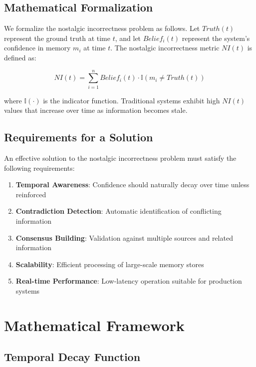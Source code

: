 \documentclass[12pt,a4paper]{article}
\begin{document}
\subsection{Mathematical Formalization}

We formalize the nostalgic incorrectness problem as follows. Let $Truth(t)$ represent the ground truth at time $t$, and let $Belief_i(t)$ represent the system's confidence in memory $m_i$ at time $t$. The nostalgic incorrectness metric $NI(t)$ is defined as:

\begin{equation}
NI(t) = \sum_{i=1}^{n} Belief_i(t) \cdot \mathbb{I}(m_i \neq Truth(t))
\end{equation}

where $\mathbb{I}(\cdot)$ is the indicator function. Traditional systems exhibit high $NI(t)$ values that increase over time as information becomes stale.

\subsection{Requirements for a Solution}

An effective solution to the nostalgic incorrectness problem must satisfy the following requirements:

\begin{enumerate}
\item \textbf{Temporal Awareness}: Confidence should naturally decay over time unless reinforced
\item \textbf{Contradiction Detection}: Automatic identification of conflicting information
\item \textbf{Consensus Building}: Validation against multiple sources and related information
\item \textbf{Scalability}: Efficient processing of large-scale memory stores
\item \textbf{Real-time Performance}: Low-latency operation suitable for production systems
\end{enumerate}

\section{Mathematical Framework}

\subsection{Temporal Decay Function}
\end{document}
